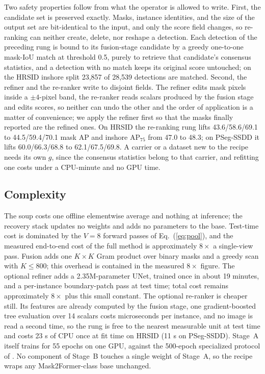 Two safety properties follow from what the operator is allowed to write. First, the candidate set is preserved exactly. Masks, instance identities, and the size of the output set are bit-identical to the input, and only the score field changes, so re-ranking can neither create, delete, nor reshape a detection. Each detection of the preceding rung is bound to its fusion-stage candidate by a greedy one-to-one mask-IoU match at threshold 0.5, purely to retrieve that candidate's consensus statistics, and a detection with no match keeps its original score untouched; on the HRSID inshore split 23{,}857 of 28{,}539 detections are matched. Second, the refiner and the re-ranker write to disjoint fields. The refiner edits mask pixels inside a $\pm 4$-pixel band, the re-ranker reads scalars produced by the fusion stage and edits scores, so neither can undo the other and the order of application is a matter of convenience; we apply the refiner first so that the masks finally reported are the refined ones. On HRSID the re-ranking rung lifts 43.6/58.6/69.1 to 44.5/59.4/70.1 mask AP and inshore AP$_{75}$ from 47.0 to 48.3; on PSeg-SSDD it lifts 60.0/66.3/68.8 to 62.1/67.5/69.8. A carrier or a dataset new to the recipe needs its own $g$, since the consensus statistics belong to that carrier, and refitting one costs under a CPU-minute and no GPU time.

\subsection{Complexity}\label{sec:complexity}

The soup costs one offline elementwise average and nothing at inference; the recovery stack updates no weights and adds no parameters to the base. Test-time cost is dominated by the $V=8$ forward passes of Eq.~(\ref{eq:pool}), and the measured end-to-end cost of the full method is approximately $8\times$ a single-view pass. Fusion adds one $K\times K$ Gram product over binary masks and a greedy scan with $K\le 800$; this overhead is contained in the measured $8\times$ figure. The optional refiner adds a 2.35M-parameter UNet, trained once in about 19 minutes, and a per-instance boundary-patch pass at test time; total cost remains approximately $8\times$ plus this small constant. The optional re-ranker is cheaper still. Its features are already computed by the fusion stage, one gradient-boosted tree evaluation over 14 scalars costs microseconds per instance, and no image is read a second time, so the rung is free to the nearest measurable unit at test time and costs 23 s of CPU once at fit time on HRSID (11 s on PSeg-SSDD). Stage~A itself trains for 55 epochs on one GPU, against the 500-epoch specialized protocol of \cite{o2former2025}. No component of Stage~B touches a single weight of Stage~A, so the recipe wraps any Mask2Former-class base unchanged.
